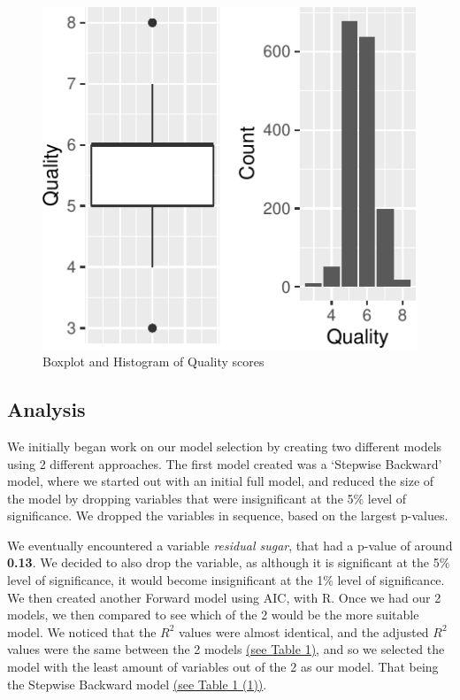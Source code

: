 \documentclass[a4paper,9pt,twocolumn,twoside,]{pinp}
\begin{document}
\begin{figure}

{\centering \includegraphics{Executive_Summary_files/figure-latex/figex-1} 

}

\caption{Boxplot and Histogram of Quality scores}\label{fig:figex}
\end{figure}

\subsection{Analysis}\label{analysis}

We initially began work on our model selection by creating two different
models using 2 different approaches. The first model created was a
`Stepwise Backward' model, where we started out with an initial full
model, and reduced the size of the model by dropping variables that were
insignificant at the 5\% level of significance. We dropped the variables
in sequence, based on the largest p-values.

We eventually encountered a variable \emph{residual sugar}, that had a
p-value of around \textbf{0.13}. We decided to also drop the variable,
as although it is significant at the 5\% level of significance, it would
become insignificant at the 1\% level of significance. We then created
another Forward model using AIC, with R. Once we had our 2 models, we
then compared to see which of the 2 would be the more suitable model. We
noticed that the \(R^2\) values were almost identical, and the adjusted
\(R^2\) values were the same between the 2 models
\hyperref[table-1]{(see Table 1)}, and so we selected the model with the
least amount of variables out of the 2 as our model. That being the
Stepwise Backward model \hyperref[table-1]{(see Table 1 (1))}.
\end{document}
